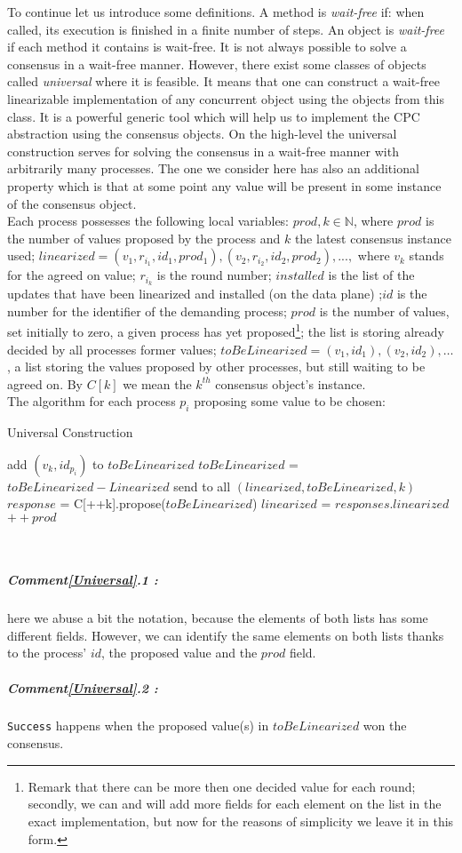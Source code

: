 \documentclass{article}
\theoremstyle{remark}
\begin{document}
To continue let us introduce some definitions. A method is \emph{wait-free} if: when called, its execution is finished in a finite number of steps. An object is \emph{wait-free} if each method it contains is wait-free. 
It is not always possible to solve a consensus in a wait-free manner. However, there exist some classes of objects called \emph{universal} where it is feasible. It means that one can construct a wait-free linearizable implementation of any concurrent object using the objects from this class. It is a powerful generic tool which will help us to implement the CPC abstraction using the consensus objects.  
On the high-level the universal construction serves for solving the consensus in a wait-free manner with arbitrarily many processes. The one we consider here has also an additional property which is that at some point any value will be present in some instance of the consensus object.\\
Each process possesses the following local variables: $prod,k\in\mathbb{N}$, where $prod$ is the number of values proposed by the process and $k$ the latest consensus instance used; $linearized=(v_1,r_{i_1},id_1,prod_1),(v_2,r_{i_2},id_2,prod_2),...,$ where $v_k$ stands for the agreed on value; $r_{i_k}$ is the round number; $installed$ is the list of the updates that have been linearized and installed (on the data plane) ;$id$ is the number for the identifier of the demanding process; $prod$ is the number of values, set initially to zero, a given process has yet proposed\footnote{Remark that there can be more then one decided value for each round; secondly, we can and will add more fields for each element on the list in the exact implementation, but now for the reasons of simplicity we leave it in this form.}; the list is storing already decided by all processes former values; $toBeLinearized = (v_1,id_1),(v_2,id_2),\ldots$, a list storing the values proposed by other processes, but still waiting to be agreed on. By $C[k]$ we mean the $k^{th}$ consensus object's instance. \\
The algorithm for each process $p_i$ proposing some value to be chosen:
\begin{algorithm}
  \caption{Universal Construction}\label{Universal}
  \begin{algorithmic}[1]
   \State add $(v_k,id_{p_i})$ to $toBeLinearized$
   \State $toBeLinearized$ = $toBeLinearized - Linearized$
   \State send to all $(linearized, toBeLinearized,k)$
   	\Repeat
   		\State $response$ = C[++k].propose($toBeLinearized$)
   		\State $linearized$ = $responses.linearized$
   	\State $++prod$
  \end{algorithmic}
\end{algorithm}
\\
\subparagraph{Comment\ref{Universal}.1 :} here we abuse a bit the notation, because the elements of both lists has some different fields. However, we can identify the same elements on both lists thanks to the process' $id$, the proposed value and the $prod$ field.
\subparagraph{Comment\ref{Universal}.2 :} \texttt{Success} happens when the proposed value(s) in $toBeLinearized$ won the consensus.
\end{document}
